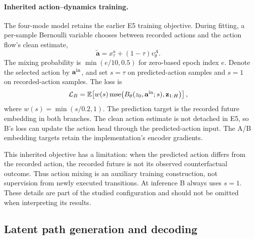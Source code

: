 \paragraph{Inherited action--dynamics training.}
The four-mode model retains the earlier E5 training objective. During fitting, a per-sample Bernoulli variable chooses between recorded actions and the action flow's clean estimate,
\begin{equation}
  \tilde{\mathbf a}=x^a_\tau+(1-\tau)v^A_\theta.
\end{equation}
The mixing probability is $\min(e/10,0.5)$ for zero-based epoch index $e$. Denote the selected action by $\mathbf a^{\rm in}$, and set $s=\tau$ on predicted-action samples and $s=1$ on recorded-action samples. The loss is
\begin{equation}
  \mathcal L_B =
  \mathbb E\!\left[
  w(s)\operatorname{mse}\!\left(
  B_\theta(z_0,\mathbf a^{\rm in};s),\mathbf z_{1:H}
  \right)\right],
  \label{eq:dynamics_loss}
\end{equation}
where $w(s)=\min(s/0.2,1)$. The prediction target is the recorded future embedding in both branches. The clean action estimate is not detached in E5, so B's loss can update the action head through the predicted-action input. The A/B embedding targets retain the implementation's encoder gradients.

This inherited objective has a limitation: when the predicted action differs from the recorded action, the recorded future is not its observed counterfactual outcome. Thus action mixing is an auxiliary training construction, not supervision from newly executed transitions. At inference B always uses $s=1$. These details are part of the studied configuration and should not be omitted when interpreting its results.

\subsection{Latent path generation and decoding}

